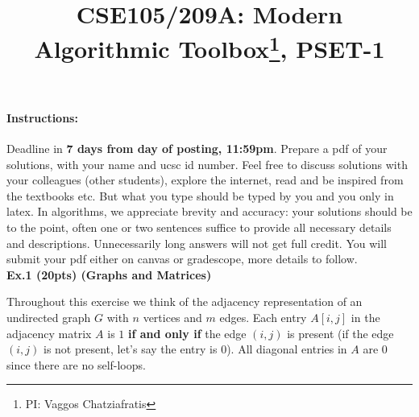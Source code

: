 \documentclass{article}
\title{CSE105/209A: Modern Algorithmic Toolbox\footnote{PI: Vaggos Chatziafratis}, PSET-1\\ }
\author{}
\date{}
\begin{document}
\maketitle
\vspace{-2cm}
\paragraph{Instructions:} Deadline in \textbf{7 days from day of posting, 11:59pm}. Prepare a pdf of your solutions, with your name and ucsc id number. Feel free to discuss solutions with your colleagues (other students), explore the internet, read and be inspired from the textbooks etc. But what you type should be typed by you and you only in latex. In algorithms, we appreciate brevity and accuracy: your solutions should be to the point, often one or two sentences suffice to provide all necessary details and descriptions. Unnecessarily long answers will not get full credit. You will submit your pdf either on canvas or gradescope, more details to follow.\\











\noindent \textbf{Ex.1 (20pts) (Graphs and Matrices)}

Throughout this exercise we think of the adjacency representation of an undirected graph $G$ with $n$ vertices and $m$ edges. Each entry $A[i,j]$ in the adjacency matrix $A$ is $1$ \textbf{if and only if} the edge $(i,j)$ is present (if the edge $(i,j)$ is not present, let's say the entry is 0). All diagonal entries in $A$ are 0 since there are no self-loops.
\end{document}

